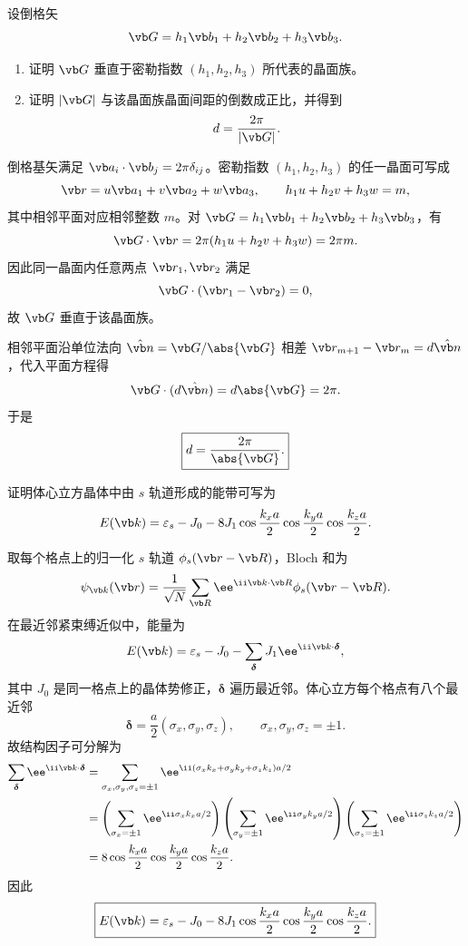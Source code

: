 \begin{question}[10 分]
设倒格矢
\[
 \vb G=h_1\vb b_1+h_2\vb b_2+h_3\vb b_3.
\]
\begin{enumerate}
  \item 证明 $\vb G$ 垂直于密勒指数 $(h_1,h_2,h_3)$ 所代表的晶面族。
  \item 证明 $\lvert\vb G\rvert$ 与该晶面族晶面间距的倒数成正比，并得到
  \[
  d=\frac{2\pi}{\lvert\vb G\rvert}.
  \]
\end{enumerate}


\begin{solution}
倒格基矢满足 $\vb a_i\cdot\vb b_j=2\pi\delta_{ij}$。密勒指数
$(h_1,h_2,h_3)$ 的任一晶面可写成
\[
 \vb r=u\vb a_1+v\vb a_2+w\vb a_3,
 \qquad h_1u+h_2v+h_3w=m,
\]
其中相邻平面对应相邻整数 $m$。对
$\vb G=h_1\vb b_1+h_2\vb b_2+h_3\vb b_3$，有
\[
 \vb G\cdot\vb r=2\pi(h_1u+h_2v+h_3w)=2\pi m.
\]
因此同一晶面内任意两点 $\vb r_1,\vb r_2$ 满足
\[
 \vb G\cdot(\vb r_1-\vb r_2)=0,
\]
故 $\vb G$ 垂直于该晶面族。

相邻平面沿单位法向 $\hat{\vb n}=\vb G/\abs{\vb G}$ 相差
$\vb r_{m+1}-\vb r_m=d\hat{\vb n}$，代入平面方程得
\[
 \vb G\cdot(d\hat{\vb n})=d\abs{\vb G}=2\pi.
\]
于是
\[
 \boxed{d=\frac{2\pi}{\abs{\vb G}}.}
\]
\end{solution}
\end{question}

\begin{question}[10 分]
证明体心立方晶体中由 $s$ 轨道形成的能带可写为
\[
 E(\vb k)=\varepsilon_s-J_0-8J_1
 \cos\frac{k_xa}{2}\cos\frac{k_ya}{2}\cos\frac{k_za}{2}.
\]


\begin{solution}
取每个格点上的归一化 $s$ 轨道 $\phi_s(\vb r-\vb R)$，Bloch 和为
\[
 \psi_{\vb k}(\vb r)=\frac1{\sqrt N}\sum_{\vb R}
 \ee^{\ii\vb k\cdot\vb R}\phi_s(\vb r-\vb R).
\]
在最近邻紧束缚近似中，能量为
\[
 E(\vb k)=\varepsilon_s-J_0-
 \sum_{\boldsymbol\delta}J_1\ee^{\ii\vb k\cdot\boldsymbol\delta},
\]
其中 $J_0$ 是同一格点上的晶体势修正，$\boldsymbol\delta$ 遍历最近邻。体心立方每个格点有八个最近邻
\[
 \boldsymbol\delta=\frac a2(\sigma_x,\sigma_y,\sigma_z),
 \qquad \sigma_x,\sigma_y,\sigma_z=\pm1.
\]
故结构因子可分解为
\[
\begin{aligned}
 \sum_{\boldsymbol\delta}\ee^{\ii\vb k\cdot\boldsymbol\delta}
 &=\sum_{\sigma_x,\sigma_y,\sigma_z=\pm1}
 \ee^{\ii(\sigma_xk_x+\sigma_yk_y+\sigma_zk_z)a/2}\\
 &=\left(\sum_{\sigma_x=\pm1}\ee^{\ii\sigma_xk_xa/2}\right)
   \left(\sum_{\sigma_y=\pm1}\ee^{\ii\sigma_yk_ya/2}\right)
   \left(\sum_{\sigma_z=\pm1}\ee^{\ii\sigma_zk_za/2}\right)\\
 &=8\cos\frac{k_xa}{2}\cos\frac{k_ya}{2}\cos\frac{k_za}{2}.
\end{aligned}
\]
因此
\[
 \boxed{E(\vb k)=\varepsilon_s-J_0-8J_1
 \cos\frac{k_xa}{2}\cos\frac{k_ya}{2}\cos\frac{k_za}{2}.}
\]
\end{solution}
\end{question}

